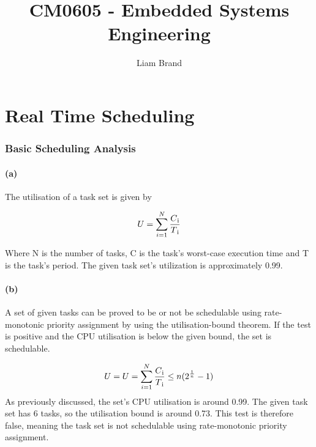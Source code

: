 \documentclass[]{report}
\title{CM0605 - Embedded Systems Engineering}
\author{Liam Brand}
\date{}
\begin{document}
\maketitle

	\chapter{Real Time Scheduling}
		\subsection{Basic Scheduling Analysis}
			\subsubsection{(a)}
			The utilisation of a task set is given by
			
			\begin{equation*}
				U = \sum_{i=1}^{N} \frac{C\textsubscript{i}}{T\textsubscript{i}}
			\end{equation*}
			
			Where N is the number of tasks, C is the task's worst-case execution time and T is the task's period. The given task set's utilization is approximately 0.99.
			
			\subsubsection{(b)}
			A set of given tasks can be proved to be or not be schedulable using rate-monotonic priority assignment by using the utilisation-bound theorem. If the test is positive and the CPU utilisation is below the given bound, the set is schedulable.
			
			\begin{equation*}
			U = U = \sum_{i=1}^{N} \frac{C\textsubscript{i}}{T\textsubscript{i}} \leq n(2^\frac{1}{n} - 1)
			\end{equation*}
			As previously discussed, the set's CPU utilisation is around 0.99. The given task set has 6 tasks, so the utilisation bound is around 0.73. This test is therefore false, meaning the task set is not schedulable using rate-monotonic priority assignment.
			
			
			
\end{document}
